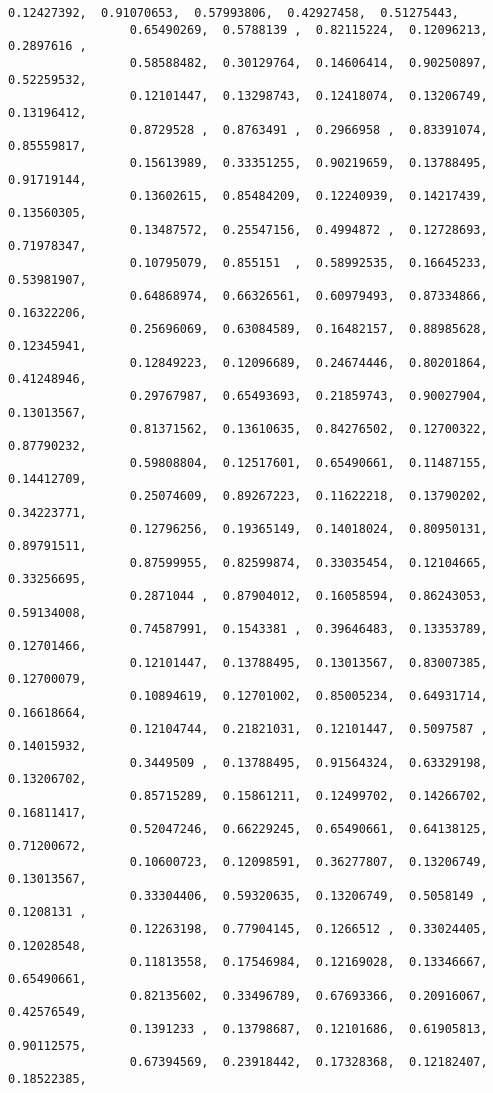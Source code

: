 \documentclass[11pt]{article}
\begin{document}
\begin{Verbatim}[commandchars=\\\{\}]
                 0.12427392,  0.91070653,  0.57993806,  0.42927458,  0.51275443,
                 0.65490269,  0.5788139 ,  0.82115224,  0.12096213,  0.2897616 ,
                 0.58588482,  0.30129764,  0.14606414,  0.90250897,  0.52259532,
                 0.12101447,  0.13298743,  0.12418074,  0.13206749,  0.13196412,
                 0.8729528 ,  0.8763491 ,  0.2966958 ,  0.83391074,  0.85559817,
                 0.15613989,  0.33351255,  0.90219659,  0.13788495,  0.91719144,
                 0.13602615,  0.85484209,  0.12240939,  0.14217439,  0.13560305,
                 0.13487572,  0.25547156,  0.4994872 ,  0.12728693,  0.71978347,
                 0.10795079,  0.855151  ,  0.58992535,  0.16645233,  0.53981907,
                 0.64868974,  0.66326561,  0.60979493,  0.87334866,  0.16322206,
                 0.25696069,  0.63084589,  0.16482157,  0.88985628,  0.12345941,
                 0.12849223,  0.12096689,  0.24674446,  0.80201864,  0.41248946,
                 0.29767987,  0.65493693,  0.21859743,  0.90027904,  0.13013567,
                 0.81371562,  0.13610635,  0.84276502,  0.12700322,  0.87790232,
                 0.59808804,  0.12517601,  0.65490661,  0.11487155,  0.14412709,
                 0.25074609,  0.89267223,  0.11622218,  0.13790202,  0.34223771,
                 0.12796256,  0.19365149,  0.14018024,  0.80950131,  0.89791511,
                 0.87599955,  0.82599874,  0.33035454,  0.12104665,  0.33256695,
                 0.2871044 ,  0.87904012,  0.16058594,  0.86243053,  0.59134008,
                 0.74587991,  0.1543381 ,  0.39646483,  0.13353789,  0.12701466,
                 0.12101447,  0.13788495,  0.13013567,  0.83007385,  0.12700079,
                 0.10894619,  0.12701002,  0.85005234,  0.64931714,  0.16618664,
                 0.12104744,  0.21821031,  0.12101447,  0.5097587 ,  0.14015932,
                 0.3449509 ,  0.13788495,  0.91564324,  0.63329198,  0.13206702,
                 0.85715289,  0.15861211,  0.12499702,  0.14266702,  0.16811417,
                 0.52047246,  0.66229245,  0.65490661,  0.64138125,  0.71200672,
                 0.10600723,  0.12098591,  0.36277807,  0.13206749,  0.13013567,
                 0.33304406,  0.59320635,  0.13206749,  0.5058149 ,  0.1208131 ,
                 0.12263198,  0.77904145,  0.1266512 ,  0.33024405,  0.12028548,
                 0.11813558,  0.17546984,  0.12169028,  0.13346667,  0.65490661,
                 0.82135602,  0.33496789,  0.67693366,  0.20916067,  0.42576549,
                 0.1391233 ,  0.13798687,  0.12101686,  0.61905813,  0.90112575,
                 0.67394569,  0.23918442,  0.17328368,  0.12182407,  0.18522385,

\end{Verbatim}
\end{document}
